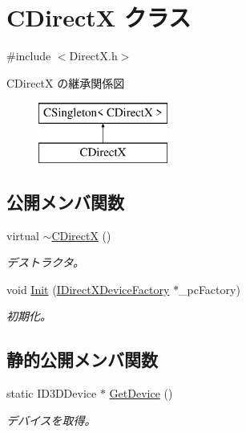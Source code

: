 \hypertarget{class_c_direct_x}{}\section{C\+Direct\+X クラス}
\label{class_c_direct_x}


{\ttfamily \#include $<$Direct\+X.\+h$>$}

C\+Direct\+X の継承関係図\begin{figure}[H]
\begin{center}
\leavevmode
\includegraphics[height=2.000000cm]{class_c_direct_x}
\end{center}
\end{figure}
\subsection*{公開メンバ関数}
\begin{DoxyCompactItemize}
\item 
virtual \hyperlink{class_c_direct_x_a59b5bb11e5e08ccc56e89197b01fc868}{$\sim$\+C\+Direct\+X} ()
\begin{DoxyCompactList}\small\item\em デストラクタ。 \end{DoxyCompactList}\item 
void \hyperlink{class_c_direct_x_ae32df5ee0af2d29f4ba27e95935e0f10}{Init} (\hyperlink{class_i_direct_x_device_factory}{I\+Direct\+X\+Device\+Factory} $\ast$\+\_\+pc\+Factory)
\begin{DoxyCompactList}\small\item\em 初期化。 \end{DoxyCompactList}\end{DoxyCompactItemize}
\subsection*{静的公開メンバ関数}
\begin{DoxyCompactItemize}
\item 
static I\+D3\+D\+Device $\ast$ \hyperlink{class_c_direct_x_a55ff92addc24828d45a9915b756cd0f1}{Get\+Device} ()
\begin{DoxyCompactList}\small\item\em デバイスを取得。 \end{DoxyCompactList}\end{DoxyCompactItemize}
